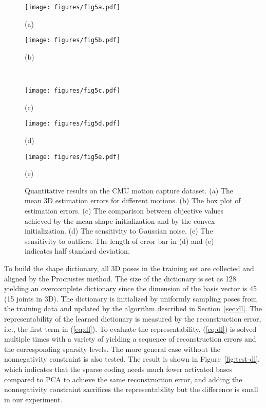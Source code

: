 \documentclass[10pt,journal,cspaper,compsoc]{IEEEtran}
\newcommand{\refEq}[1]{(\ref{#1})}
\newcommand{\refFig}[1]{Figure~\ref{#1}}
\newcommand{\refSec}[1]{Section~\ref{#1}}
\begin{document}
\begin{figure*}
  \centering
  \begin{minipage}[b]{0.52\linewidth}
  \centering
  \texttt{[image: figures/fig5a.pdf]} \\
  \centerline{(a)}
  \end{minipage}
  \hspace{1em}
  \begin{minipage}[b]{0.4\linewidth}
  \centering
  \texttt{[image: figures/fig5b.pdf]} \\
  \centerline{(b)}
  \end{minipage}\\
  \vspace{1em}
  \begin{minipage}[b]{0.25\linewidth}
  \centering
  \texttt{[image: figures/fig5c.pdf]} \\
  \centerline{(c)}
  \end{minipage}
  \hspace{1em}
  \begin{minipage}[b]{0.33\linewidth}
  \centering
  \texttt{[image: figures/fig5d.pdf]} \\
  \centerline{(d)}
  \end{minipage}
  \begin{minipage}[b]{0.33\linewidth}
  \centering
  \texttt{[image: figures/fig5e.pdf]} \\
  \centerline{(e)}
  \end{minipage}
  \caption{Quantitative results on the CMU motion capture dataset. (a) The mean 3D estimation errors for different motions. (b) The box plot of estimation errors. (c) The comparison between objective values achieved by the mean shape initialization and by the convex initialization. (d) The sensitivity to Gaussian noise. (e) The sensitivity to outliers. The length of error bar in (d) and (e) indicates half standard deviation. }\label{fig:mocap-quant}
\end{figure*}

To build the shape dictionary, all 3D poses in the training set are collected and aligned by the Procrustes method. The size of the dictionary  is set as 128 yielding an overcomplete dictionary since the dimension of the basis vector is 45 (15 joints in 3D). The dictionary is initialized by uniformly sampling  poses from the training data and updated by the algorithm described in \refSec{sec:dl}. The representability of the learned dictionary is measured by the reconstruction error, i.e., the first term in \refEq{eq:dl}. To evaluate the representability, \refEq{eq:dl} is solved multiple times with a variety of  yielding a sequence of reconstruction errors and the corresponding sparsity levels. The more general case without the nonnegativity constraint is also tested. The result is shown in \refFig{fig:test-dl}, which indicates that the sparse coding needs much fewer activated bases compared to PCA to achieve the same reconstruction error, {and adding the nonnegativity constraint sacrifices the representability but the difference is small in our experiment}.
\end{document}
